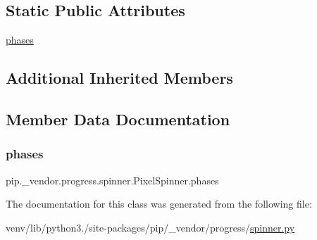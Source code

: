 \subsection*{Static Public Attributes}
\begin{DoxyCompactItemize}
\item 
\hyperlink{classpip_1_1__vendor_1_1progress_1_1spinner_1_1PixelSpinner_a9ed4fd499f8cfdbfe49b7fa04d4c0ca6}{phases}
\end{DoxyCompactItemize}
\subsection*{Additional Inherited Members}


\subsection{Member Data Documentation}
\mbox{\label{classpip_1_1__vendor_1_1progress_1_1spinner_1_1PixelSpinner_a9ed4fd499f8cfdbfe49b7fa04d4c0ca6}} 
\subsubsection{\texorpdfstring{phases}{phases}}
{\footnotesize\ttfamily pip.\+\_\+vendor.\+progress.\+spinner.\+Pixel\+Spinner.\+phases\hspace{0.3cm}{\ttfamily [static]}}



The documentation for this class was generated from the following file\+:\begin{DoxyCompactItemize}
\item 
venv/lib/python3./site-\/packages/pip/\+\_\+vendor/progress/\hyperlink{spinner_8py}{spinner.\+py}\end{DoxyCompactItemize}
